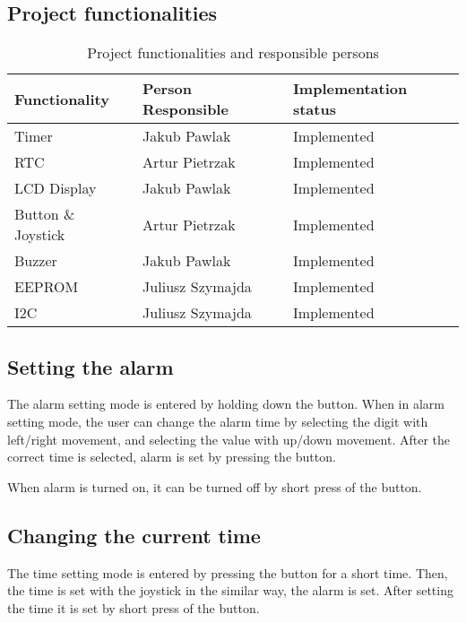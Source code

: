 \documentclass[10pt]{article}
\begin{document}
\subsection{Project functionalities}
\begin{table}[H]\centering
	\begin{tabular}{|l|l|l|}
		\hline
		\bf Functionality  & \bf Person Responsible & \bf Implementation status \\ \hline
		Timer              & Jakub Pawlak           & Implemented               \\ \hline
		RTC                & Artur Pietrzak         & Implemented               \\ \hline
		LCD Display        & Jakub Pawlak           & Implemented               \\ \hline
		Button \& Joystick & Artur Pietrzak         & Implemented               \\ \hline
		Buzzer             & Jakub Pawlak           & Implemented               \\ \hline
		EEPROM             & Juliusz Szymajda       & Implemented               \\ \hline
		I2C                & Juliusz Szymajda       & Implemented               \\ \hline
	\end{tabular}
	\caption{Project functionalities and responsible persons}
\end{table}

\subsection{Setting the alarm}
The alarm setting mode is entered by holding down the button.
When in alarm setting mode, the user can change the alarm time by selecting the digit with left/right movement, and selecting the value with up/down movement.
After the correct time is selected, alarm is set by pressing the button.

When alarm is turned on, it can be turned off by short press of the button.

\subsection{Changing the current time}
The time setting mode is entered by pressing the button for a short time.
Then, the time is set with the joystick in the similar way, the alarm is set.
After setting the time it is set by short press of the button.
\end{document}
